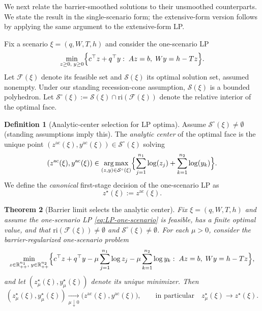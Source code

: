 \documentclass[11pt]{article}
\theoremstyle{plain}
\newtheorem{theorem}{Theorem}[section]
\theoremstyle{definition}
\newtheorem{definition}[theorem]{Definition}
\theoremstyle{remark}
\newcommand{\ri}{\mathrm{ri}}
\newcommand{\argmax}{\operatorname*{arg\,max}}
\begin{document}
We next relate the barrier-smoothed solutions to their unsmoothed counterparts. We state the result in the
single-scenario form; the extensive-form version follows by applying the same argument to the extensive-form
LP.

Fix a scenario $\xi=(q,W,T,h)$ and consider the one-scenario LP
\begin{equation}\label{eq:LP-one-scenario}
\min_{z\ge 0,\;y\ge 0}\Bigl\{c^\top z+q^\top y:\;Az=b,\;Wy=h-Tz\Bigr\}.
\end{equation}
Let $\mathcal{F}(\xi)$ denote its feasible set and $\mathcal{S}(\xi)$ its optimal solution set, assumed nonempty.
Under our standing recession-cone assumption, $\mathcal{S}(\xi)$ is a bounded polyhedron.
Let $\mathcal{S}^\circ(\xi):=\mathcal{S}(\xi)\cap\ri(\mathcal{F}(\xi))$ denote the relative interior of the optimal face.

\begin{definition}[Analytic-center selection for LP optima]\label{def:ac}
Assume $\mathcal{S}^\circ(\xi)\neq\emptyset$ (standing assumptions imply this). The \emph{analytic center}
of the optimal face is the unique point $(z^{\mathrm{ac}}(\xi),y^{\mathrm{ac}}(\xi))\in\mathcal{S}^\circ(\xi)$ solving
\begin{equation}\label{eq:ac}
(z^{\mathrm{ac}}(\xi),y^{\mathrm{ac}}(\xi))
\in\argmax_{(z,y)\in\mathcal{S}^\circ(\xi)}
\Bigl\{\sum_{j=1}^{n_1}\log(z_j)+\sum_{k=1}^{n_2}\log(y_k)\Bigr\}.
\end{equation}
We define the \emph{canonical} first-stage decision of the one-scenario LP as
\[
z^\star(\xi):=z^{\mathrm{ac}}(\xi).
\]
\end{definition}

\begin{theorem}[Barrier limit selects the analytic center]\label{thm:central-path-limit}
Fix $\xi=(q,W,T,h)$ and assume the one-scenario LP \eqref{eq:LP-one-scenario} is feasible, has a finite
optimal value, and that $\ri(\mathcal{F}(\xi))\neq\emptyset$ and $\mathcal{S}^\circ(\xi)\neq\emptyset$.
For each $\mu>0$, consider the barrier-regularized one-scenario problem
\begin{equation}\label{eq:barrier-one-scenario}
\min_{z\in\mathbb{R}^{n_1}_{++},\;y\in\mathbb{R}^{n_2}_{++}}
\Bigl\{c^\top z+q^\top y-\mu\sum_{j=1}^{n_1}\log z_j-\mu\sum_{k=1}^{n_2}\log y_k:\;Az=b,\;Wy=h-Tz\Bigr\},
\end{equation}
and let $(z_\mu^\star(\xi),y_\mu^\star(\xi))$ denote its unique minimizer.
Then
\[
(z_\mu^\star(\xi),y_\mu^\star(\xi))\xrightarrow[\mu\downarrow 0]{}\bigl(z^{\mathrm{ac}}(\xi),y^{\mathrm{ac}}(\xi)\bigr),
\qquad\text{in particular}\quad z_\mu^\star(\xi)\to z^\star(\xi).
\]
\end{theorem}
\end{document}
